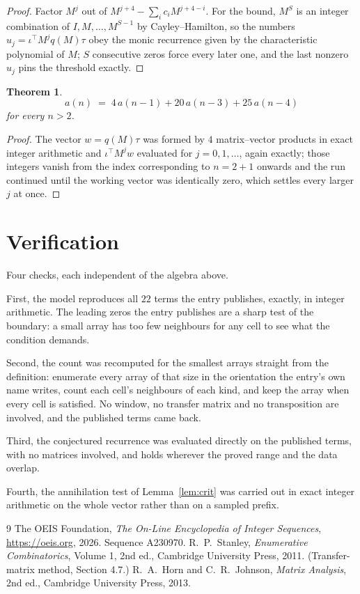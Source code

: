 \documentclass[11pt,a4paper]{article}
\theoremstyle{plain}
\newtheorem{theorem}{Theorem}
\theoremstyle{definition}
\begin{document}
\begin{proof}
Factor $M^{j}$ out of $M^{j+4}-\sum_ic_iM^{j+4-i}$. For the bound, $M^{S}$
is an integer combination of $I,M,\dots,M^{S-1}$ by Cayley--Hamilton, so the numbers
$u_j=\iota^{\!\top}M^{j}q(M)\tau$ obey the monic recurrence given by the characteristic
polynomial of $M$; $S$ consecutive zeros force every later one, and the last nonzero $u_j$
pins the threshold exactly.
\end{proof}

\begin{theorem}
\[
a(n)\;=\;4\,a(n-1) + 20\,a(n-3) + 25\,a(n-4)
\]
for every $n>2$.
\end{theorem}

\begin{proof}
The vector $w=q(M)\tau$ was formed by $4$ matrix--vector products in exact integer
arithmetic and $\iota^{\!\top}M^{j}w$ evaluated for $j=0,1,\dots$, again exactly; those
integers vanish from the index corresponding to $n=2+1$ onwards and the run continued
until the working vector was identically zero, which settles every larger $j$ at once.
\end{proof}

\section{Verification}

Four checks, each independent of the algebra above.

First, the model reproduces all $22$ terms the entry publishes, exactly, in integer
arithmetic. The leading zeros the entry publishes are a sharp test of the boundary: a small
array has too few neighbours for any cell to see what the condition demands.

Second, the count was recomputed for the smallest arrays straight from the definition:
enumerate every array of that size in the orientation the entry's own name writes, count each
cell's neighbours of each kind, and keep the array when every cell is satisfied. No window, no
transfer matrix and no transposition are involved, and the published terms came back.

Third, the conjectured recurrence was evaluated directly on the published terms, with no
matrices involved, and holds wherever the proved range and the data overlap.

Fourth, the annihilation test of Lemma~\ref{lem:crit} was carried out in exact integer
arithmetic on the whole vector rather than on a sampled prefix.

\begin{thebibliography}{9}
 The OEIS Foundation, \emph{The On-Line Encyclopedia of Integer
Sequences}, \url{https://oeis.org}, 2026. Sequence A230970.
 R.~P.~Stanley, \emph{Enumerative Combinatorics}, Volume 1, 2nd ed.,
Cambridge University Press, 2011. (Transfer-matrix method, Section 4.7.)
 R.~A.~Horn and C.~R.~Johnson, \emph{Matrix Analysis}, 2nd ed., Cambridge
University Press, 2013.
\end{thebibliography}
\end{document}
